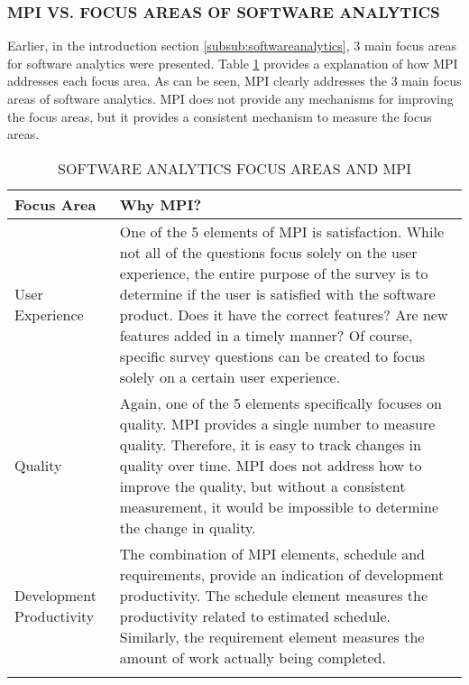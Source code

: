 \documentclass[SDSUThesis.tex]{subfiles}
\begin{document}
        \subsubsection{MPI VS. FOCUS AREAS OF SOFTWARE ANALYTICS}
    
            Earlier, in the introduction section \ref{subsub:softwareanalytics}, 3 main focus 
            areas  for software
            analytics were presented.  Table \ref{tab:focusareas} provides a explanation of how MPI addresses
            each focus area.  
            As can be seen, MPI clearly addresses the 3 main focus areas of software analytics.  MPI does not provide
            any mechanisms for improving the focus areas, but it provides a consistent mechanism to measure
            the focus areas. 
            
            \begin{longtable}{p{3cm}p{11cm}}
                \toprule%
                 \centering%
                 {\bfseries Focus Area}
                 & {\bfseries Why MPI?} \\
                
                \cmidrule[0.4pt](r{0.125em}){1-1}%
                \cmidrule[0.4pt](lr{0.125em}){2-2}%
                \endhead
                
                User Experience & One of the 5 elements of MPI is satisfaction.  While not all of the questions focus solely on the user experience, the entire purpose of the survey is to determine if the user is satisfied
                with the software product. Does it have the correct features? Are new features added in a timely manner? Of course, specific survey questions can be created to focus solely on a certain user experience. \\
                \myrowcolour%
                Quality & Again, one of the 5 elements specifically focuses on quality.  MPI provides a single number
                to measure quality.  Therefore, it is easy to track changes in quality over time.  MPI does not address
                how to improve the quality, but without a consistent measurement, it would be impossible to determine the change in quality. \\
                Development Productivity & The combination of MPI elements, schedule and requirements, provide an 
                indication of development productivity. The schedule element measures the productivity
                related to estimated schedule. Similarly, the requirement element measures the amount of
                work actually being completed.  \\
                
                \bottomrule
                
                \caption{SOFTWARE ANALYTICS FOCUS AREAS AND MPI}
                \label{tab:focusareas}
            \end{longtable}
        
\end{document}
